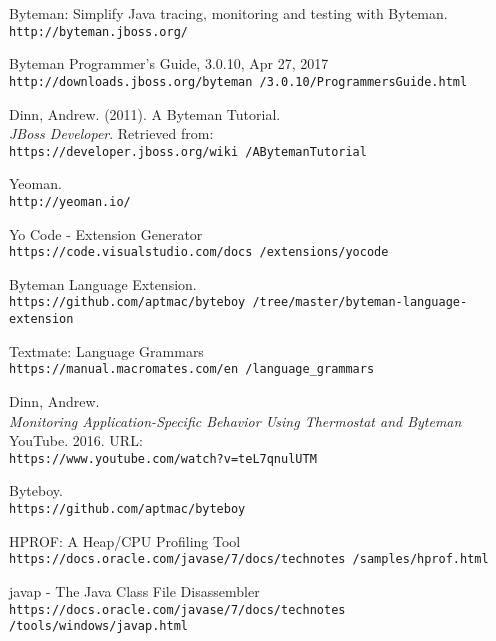 \documentclass[letterpaper,twocolumn,10pt]{article}
\begin{document}
\begin{thebibliography}{99}

Byteman: Simplify Java tracing, monitoring and testing with Byteman.
\\\texttt{http://byteman.jboss.org/}

Byteman Programmer's Guide, 3.0.10, Apr 27, 2017
\\\texttt{http://downloads.jboss.org/byteman
/3.0.10/ProgrammersGuide.html}

Dinn, Andrew. (2011). A Byteman Tutorial. \\\textit{JBoss Developer}. Retrieved from: 
\\\texttt{https://developer.jboss.org/wiki
/ABytemanTutorial}

Yeoman.
\\\texttt{http://yeoman.io/}

Yo Code - Extension Generator
\\\texttt{https://code.visualstudio.com/docs
/extensions/yocode}

Byteman Language Extension.
\\\texttt{https://github.com/aptmac/byteboy
/tree/master/byteman-language-extension}

Textmate: Language Grammars
\\\texttt{https://manual.macromates.com/en
/language\_grammars}

Dinn, Andrew. \\\textit{Monitoring Application-Specific Behavior Using Thermostat and Byteman}
YouTube. 2016. URL: \\\texttt{https://www.youtube.com/watch?v=teL7qnulUTM}

Byteboy.
\\\texttt{https://github.com/aptmac/byteboy}

HPROF: A Heap/CPU Profiling Tool
\\\texttt{https://docs.oracle.com/javase/7/docs/technotes
/samples/hprof.html}

javap - The Java Class File Disassembler
\\\texttt{https://docs.oracle.com/javase/7/docs/technotes
/tools/windows/javap.html}

\end{thebibliography}
\end{document}
